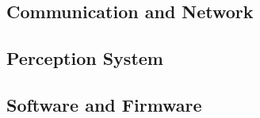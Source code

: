 \subsection{Communication and Network}\label{subsec:v2x-communication-and-network}

\subsection{Perception System}\label{subsec:perception-system}

\subsection{Software and Firmware}\label{subsec:software-and-firmware}
